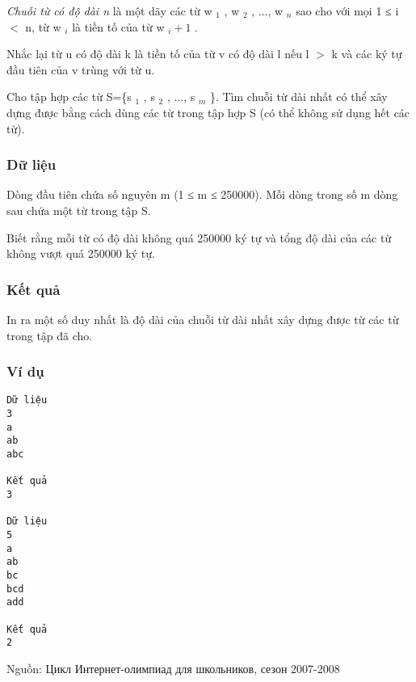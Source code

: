 



\textit{    Chuỗi từ có độ dài n   }   là một dãy các từ w   $_    1   $   , w   $_    2   $   , ..., w   $_    n   $   sao cho với mọi 1 ≤ i $<$ n, từ w   $_    i   $   là tiền tố của từ w   $_    i+1   $   .  

   Nhắc lại từ u có độ dài k là tiền tố của từ v có độ dài l nếu l $>$ k và các ký tự đầu tiên của v trùng với từ u.  

   Cho tập hợp các từ S=\{s   $_    1   $   , s   $_    2   $   , ..., s   $_    m   $   \}. Tìm chuỗi từ dài nhất có thể xây dựng  được bằng cách dùng các từ trong tập hợp S (có thể không sử dụng hết các từ).  

\subsubsection{   Dữ liệu  }

   Dòng đầu tiên chứa số nguyên m (1 ≤ m ≤ 250000). Mỗi dòng trong số m dòng sau chứa một từ trong tập S.  

   Biết rằng mỗi từ có độ dài không quá 250000 ký tự và tổng độ dài của các từ không vượt quá 250000 ký tự.  

\subsubsection{   Kết quả  }

   In ra một số duy nhất là độ dài của chuỗi từ dài nhất xây dựng được từ các từ trong tập đã cho.  

\subsubsection{   Ví dụ  }
\begin{verbatim}
Dữ liệu
3
a
ab
abc

Kết quả
3

Dữ liệu
5
a
ab
bc
bcd
add

Kết quả
2
\end{verbatim}

   Nguồn: Цикл Интернет-олимпиад для школьников, сезон 2007-2008  